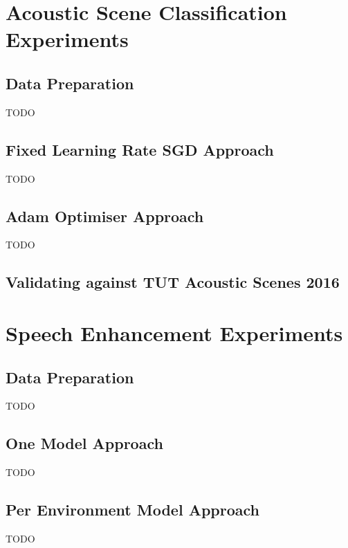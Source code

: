\documentclass[logo,bsc,singlespacing,parskip,online]{infthesis}
\begin{document}


\chapter{Acoustic Scene Classification Experiments}
\label{chap:acoustic-scene-classification}
\section{Data Preparation}
TODO
\section{Fixed Learning Rate SGD Approach}
TODO
\section{Adam Optimiser Approach}
TODO

\section{Validating against TUT Acoustic Scenes 2016}

\chapter{Speech Enhancement Experiments}
\section{Data Preparation}
TODO
\section{One Model Approach}
TODO
\section{Per Environment Model Approach}
TODO
\end{document}
